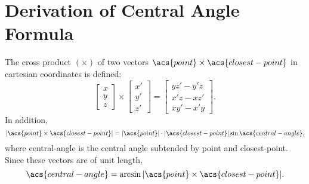 \chapter{Derivation of Central Angle Formula}

The cross product $(\times)$ of two vectors $\acs{point}\times\acs{closest-point}$ in cartesian coordinates is defined:
\begin{equation}
    \begin{bmatrix}
        x\\y\\z
    \end{bmatrix}
    \times
    \begin{bmatrix}
        x'\\y'\\z'
    \end{bmatrix}
    =
    \begin{bmatrix}
        yz'-y'z\\x'z-xz'\\xy'-x'y
    \end{bmatrix}.
\end{equation}
In addition,
\begin{equation}
    |\acs{point}\times\acs{closest-point}|=|\acs{point}|\cdot|\acs{closest-point}|\sin\acs{central-angle},
\end{equation}
where \acs{central-angle} is the central angle subtended by \acs{point} and \acs{closest-point}. Since these vectors are of unit length,
\begin{equation}
    \acs{central-angle}=\arcsin|\acs{point}\times\acs{closest-point}|.
\end{equation}